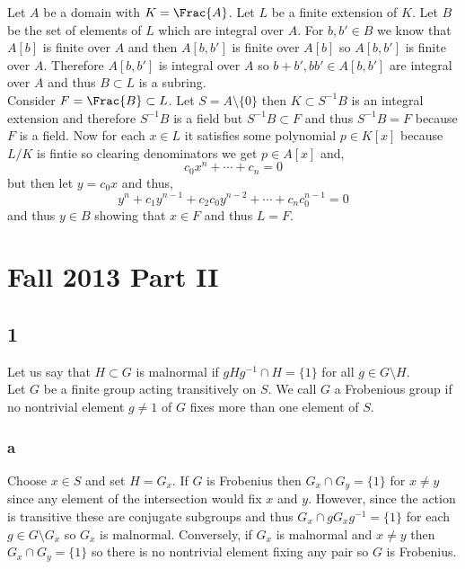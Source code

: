 \documentclass[12pt]{article}
\begin{document}
Let $A$ be a domain with $K = \Frac{A}$. Let $L$ be a finite extension of $K$. Let $B$ be the set of elements of $L$ which are integral over $A$. For $b, b' \in B$ we know that $A[b]$ is finite over $A$ and then $A[b, b']$ is finite over $A[b]$ so $A[b, b']$ is finite over $A$. Therefore $A[b, b']$ is integral over $A$ so $b+b', bb' \in A[b,b']$ are integral over $A$ and thus $B \subset L$ is a subring. 
\bigskip\\
Consider $F = \Frac{B} \subset L$. Let $S = A \setminus \{ 0 \}$ then $K \subset S^{-1} B$ is an integral extension and therefore $S^{-1} B$ is a field but $S^{-1} B \subset F$ and thus $S^{-1} B = F$ because $F$ is a field. Now for each $x \in L$ it satisfies some polynomial $p \in K[x]$ because $L / K$ is fintie so clearing denominators we get $p \in A[x]$ and,
\[ c_0 x^n + \cdots + c_n = 0 \]
but then let $y = c_0 x$ and thus,
\[ y^n + c_1 y^{n-1} + c_2 c_0 y^{n-2} + \cdots + c_n c_0^{n-1} = 0 \]
and thus $y \in B$ showing that $x \in F$ and thus $L = F$.

\section{Fall 2013 Part II}


\subsection{1}

Let us say that $H \subset G$ is malnormal if $g H g^{-1} \cap H = \{ 1 \}$ for all $g \in G \setminus H$.
\bigskip\\
Let $G$ be a finite group acting transitively on $S$. We call $G$ a Frobenious group if no nontrivial element $g \neq 1$ of $G$ fixes more than one element of $S$.

\subsubsection{a}

Choose $x \in S$ and set $H = G_x$. If $G$ is Frobenius then $G_x \cap G_y = \{ 1 \}$ for $x \neq y$ since any element of the intersection would fix $x$ and $y$. However, since the action is transitive these are conjugate subgroups and thus $G_x \cap g G_x g^{-1} = \{ 1 \}$ for each $g \in G \setminus G_x$ so $G_x$ is malnormal. Conversely, if $G_x$ is malnormal and $x \neq y$ then $G_x \cap G_y = \{ 1 \}$ so there is no nontrivial element fixing any pair so $G$ is Frobenius. 
\end{document}
